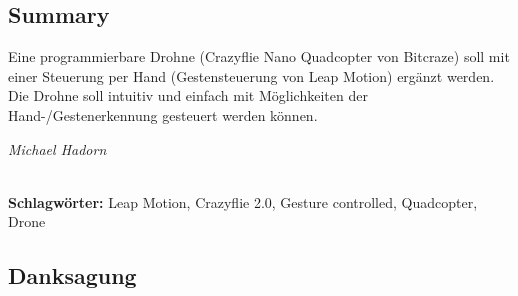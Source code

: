 
\subsection*{Summary}
Eine programmierbare Drohne (Crazyflie Nano Quadcopter von Bitcraze) soll mit einer Steuerung per Hand (Gestensteuerung von Leap Motion) ergänzt werden. Die Drohne soll intuitiv und einfach mit Möglichkeiten der Hand-/Gestenerkennung gesteuert werden können.
\begin{flushright}
	\textit{Michael Hadorn}	
\end{flushright}

%
\mbox{}\\[0.5\baselineskip]\noindent
\textbf{Schlagwörter:} 
Leap Motion, Crazyflie 2.0, Gesture controlled, Quadcopter, Drone

\vfill
\subsection*{Danksagung}
